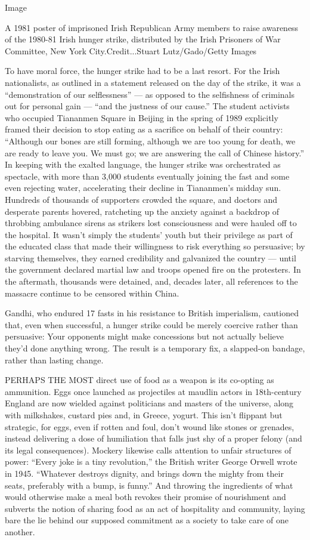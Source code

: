 Image

A 1981 poster of imprisoned Irish Republican Army members to raise
awareness of the 1980-81 Irish hunger strike, distributed by the Irish
Prisoners of War Committee, New York City.Credit...Stuart
Lutz/Gado/Getty Images

To have moral force, the hunger strike had to be a last resort. For the
Irish nationalists, as outlined in a statement released on the day of
the strike, it was a ``demonstration of our selflessness'' --- as
opposed to the selfishness of criminals out for personal gain --- ``and
the justness of our cause.'' The student activists who occupied
Tiananmen Square in Beijing in the spring of 1989 explicitly framed
their decision to stop eating as a sacrifice on behalf of their country:
``Although our bones are still forming, although we are too young for
death, we are ready to leave you. We must go; we are answering the call
of Chinese history.'' In keeping with the exalted language, the hunger
strike was orchestrated as spectacle, with more than 3,000 students
eventually joining the fast and some even rejecting water, accelerating
their decline in Tiananmen's midday sun. Hundreds of thousands of
supporters crowded the square, and doctors and desperate parents
hovered, ratcheting up the anxiety against a backdrop of throbbing
ambulance sirens as strikers lost consciousness and were hauled off to
the hospital. It wasn't simply the students' youth but their privilege
as part of the educated class that made their willingness to risk
everything so persuasive; by starving themselves, they earned
credibility and galvanized the country --- until the government declared
martial law and troops opened fire on the protesters. In the aftermath,
thousands were detained, and, decades later, all references to the
massacre continue to be censored within China.

Gandhi, who endured 17 fasts in his resistance to British imperialism,
cautioned that, even when successful, a hunger strike could be merely
coercive rather than persuasive: Your opponents might make concessions
but not actually believe they'd done anything wrong. The result is a
temporary fix, a slapped-on bandage, rather than lasting change.

PERHAPS THE MOST direct use of food as a weapon is its co-opting as
ammunition. Eggs once launched as projectiles at maudlin actors in
18th-century England are now wielded against politicians and masters of
the universe, along with milkshakes, custard pies and, in Greece,
yogurt. This isn't flippant but strategic, for eggs, even if rotten and
foul, don't wound like stones or grenades, instead delivering a dose of
humiliation that falls just shy of a proper felony (and its legal
consequences). Mockery likewise calls attention to unfair structures of
power: ``Every joke is a tiny revolution,'' the British writer George
Orwell wrote in 1945. ``Whatever destroys dignity, and brings down the
mighty from their seats, preferably with a bump, is funny.'' And
throwing the ingredients of what would otherwise make a meal both
revokes their promise of nourishment and subverts the notion of sharing
food as an act of hospitality and community, laying bare the lie behind
our supposed commitment as a society to take care of one another.

